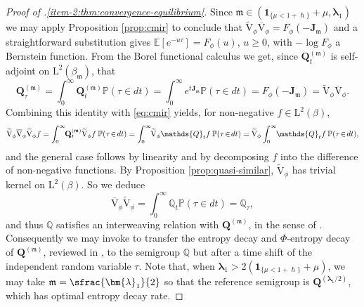 \documentclass[10pt]{amsart}
\theoremstyle{plain}
\theoremstyle{definition}
\newcommand{\E}{\mathbb{E}}
\newcommand{\Prob}{\mathbb{P}}
\newcommand{\J}{\mathds{Q}}
\newcommand{\Leb}{\mathrm{L}}
\newcommand{\calJd}{\mathbf{J}}
\newcommand{\m}{\mathfrak{m}}
\newcommand{\lam}{{\bm{\lambda}_1}}
\newcommand{\Q}[1][\mo]{\mathbf{Q}^{({#1})}}
\newcommand{\gab}[1][\lam,\mo]{{\beta_{#1}}}
\let\h\hslash
\let\mo\mu
\let\bpsi\beta
\begin{document}
\begin{proof}[Proof of .\eqref{item-2:thm:convergence-equilibrium}]
Since $\m \in (\bm{1}_{\{\mo < 1+\h\}} + \mo, \lam)$ we may apply Proposition \ref{prop:cmir} to conclude that $\widetilde{\mathrm{V}}_\phi \overline{\mathrm{V}}_\phi = F_\phi(-\calJd_{\m})$ and a straightforward substitution gives $\E\left[e^{-u\tau}\right] = F_\phi(u)$, $u \geq 0$, with $-\log F_\phi$ a Bernstein function. From the Borel functional calculus we get, since $\Q[\m]_t$ is self-adjoint on $\Leb^2(\gab[\m])$, that
\begin{equation*}
\Q[\m]_\tau = \int_0^\infty \Q[\m]_t \Prob(\tau \in dt) = \int_0^\infty e^{t\calJd_{\m}} \Prob(\tau \in dt) = F_\phi(-\calJd_{\m}) = \widetilde{\mathrm{V}}_\phi \overline{\mathrm{V}}_\phi.
\end{equation*}
Combining this identity with \eqref{eq:cmir} yields, for non-negative $f \in \Leb^2(\bpsi)$,
\begin{equation*}
\widetilde{\mathrm{V}}_\phi \overline{\mathrm{V}}_\phi \widetilde{\mathrm{V}}_\phi f = \int_0^\infty\hspace*{-1mm} \Q[\m]_t \widetilde{\mathrm{V}}_\phi f \: \Prob(\tau\!\in\!dt) = \int_0^\infty\hspace*{-1mm} \widetilde{\mathrm{V}}_\phi \J_t f \: \Prob(\tau\!\in\!dt) = \widetilde{\mathrm{V}}_\phi \int_0^\infty\hspace*{-1mm} \J_t f \: \Prob(\tau\!\in\!dt),
\end{equation*}
and the general case follows by linearity and by decomposing $f$ into the difference of non-negative functions. By Proposition \ref{prop:quasi-similar}, $\widetilde{\mathrm{V}}_\phi$ has trivial kernel on $\Leb^2(\bpsi)$. So we deduce
\begin{equation}
\label{eq:J-tau}
\overline{\mathrm{V}}_\phi \widetilde{\mathrm{V}}_\phi = \int_0^\infty \J_t \Prob(\tau\!\in\!dt) = \J_\tau,
\end{equation}
and thus $\J$ satisfies an interweaving relation with $\Q[\m]$, in the sense of \cite{Patie-Miclo}. Consequently we may invoke \cite[Ths.\,7, 24]{Patie-Miclo} to transfer the entropy decay and $\Phi$-entropy decay of $\Q[\m]$, reviewed in , to the semigroup $\J$ but after a time shift of the independent random variable $\tau$. Note that, when $\lam > 2(\bm{1}_{\{\mo < 1+\h\}} + \mo)$, we may take $\m = \sfrac{\lam}{2}$ so that the reference semigroup is $\Q[\lam/2]$, which has optimal entropy decay rate.
\end{proof}
\end{document}
